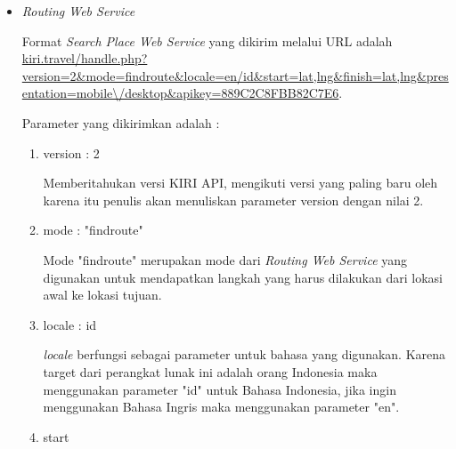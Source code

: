 \begin{itemize}
	\begin{lstlisting} [caption= hasil kembalian dari \textit{Search Place Web Service}]
	{
			"status":"ok",
			"searchresult":[
					{
						"placename":"J.Co Donuts & Coffee",
						"location":"-6.88929,107.59574"
					},
					{
						"placename":"Pepper Lunch Bandung (PVJ)",
						"location":"-6.88923,107.59615"
					},
					{
						"placename":"Domino's Pizza Pvj",
						"location":"-6.90348,107.61709"
					},
					{
						"placename":"Outlet Alleira Batik PVJ Bandung",
						"location":"-6.88875,107.59634"
					},
					{
						"placename":"Burger King Bandung PVJ Mall",
						"location":"-6.88894,107.59342"
					},
					{
						"placename":"Killiney Kopitiam PVJ",
						"location":"-6.88947,107.59654"
					},
					{
						"placename":"Adidas Pvj",
						"location":"-6.88909,107.59614"
					},
					{
						"placename":"Crocs - PVJ",
						"location":"-6.88894,107.59342"
					},
					{
						"placename":"Cross Pvj",
						"location":"-6.88906,107.59619"
					},
					{
						"placename":"Jonas Photo - PVJ",
						"location":"-6.88913,107.59643"
					}
				],
				"attributions":null
	}\end{lstlisting}
	
	\item \textit{Routing Web Service}
	
	Format \textit{Search Place Web Service} yang dikirim melalui URL adalah \url{kiri.travel/handle.php?version=2\&mode=findroute\&locale=en/id\&start=lat,lng\&finish=lat,lng\&presentation=mobile\/desktop\&apikey=889C2C8FBB82C7E6}.
	
	Parameter yang dikirimkan adalah :
	
	\begin{enumerate}
		\item version : 2
		
		Memberitahukan versi KIRI API, mengikuti versi yang paling baru oleh karena itu penulis akan menuliskan parameter version dengan nilai 2.
		\item mode : "findroute"
		
		Mode "findroute" merupakan mode dari \textit{Routing Web Service} yang digunakan untuk mendapatkan langkah yang harus dilakukan dari lokasi awal ke lokasi tujuan.
		\item locale : id
		
		\textit{locale} berfungsi sebagai parameter untuk bahasa yang digunakan. Karena target dari perangkat lunak ini adalah orang Indonesia maka menggunakan parameter "id" untuk Bahasa Indonesia, jika ingin menggunakan Bahasa Ingris maka menggunakan parameter "en".
		\item start
		

\end{enumerate}
\end{itemize}
